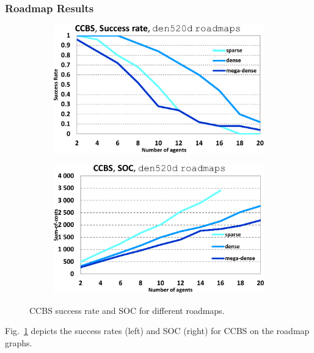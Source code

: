 \documentclass[review]{elsarticle}
\newcommand\konstantin[1]{\nb{\textbf{Konstantin:}}{red}{#1}}
\newcommand\roni[1]{\nb{\textbf{Roni:}}{green}{#1}}
\newcommand{\ccbs}{\ac{CCBS}\xspace}
\begin{document}
\subsubsection{Roadmap Results}


\begin{figure}
\centering
    \centering
    
    \begin{subfigure}
        \centering
        \includegraphics[width=0.45\linewidth]{mapfr-sr-plot-ccbs-den520d_roadmaps.pdf}
    \end{subfigure}\hspace{0.025\linewidth}
    \begin{subfigure}
        \centering
        \includegraphics[width=0.45\linewidth]{mapfr-SOC-plot-ccbs-den520d_roadmaps.pdf}
    \end{subfigure}%
    
    \caption{\ccbs success rate and SOC for different roadmaps.}
    \label{fig:results-ccbs-SR-SOC-roadmaps}
\end{figure}

Fig.~\ref{fig:results-ccbs-SR-SOC-roadmaps} depicts the success rates (left) and SOC (right) for \ccbs on the roadmap graphs. 
\end{document}
